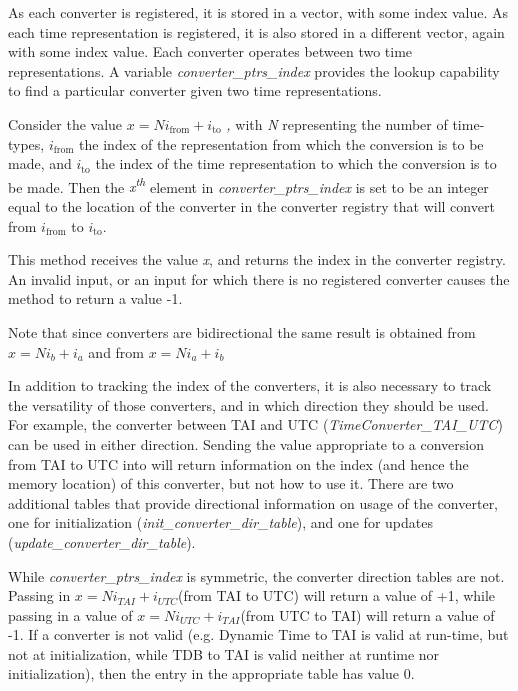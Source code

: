 {\begin{enumerate}
{\begin{enumerate}
\label{ref:getconvptrindex}As each converter is registered, it is stored
in a vector, with some index value.  As each time representation is
registered, it is also stored in a different vector, again with some
index value.  Each converter operates between two time representations.
 A variable \textit{converter\_ptrs\_index }provides the lookup
capability to find a particular converter given two time
representations.




Consider the value  $x=Ni_{\text{from}}+i_{\text{to}}$\textit{ , }with 
\textit{N}
representing the number of time-types,  $i_{\text{from}}$ the index of
the representation from which the conversion is to be made, and 
$i_{\text{to}}$ the index of the time representation to which the
conversion is to be made.  Then the
\textit{x}\textit{\textsuperscript{th}}\textit{ }element in 
\textit{converter\_ptrs\_index }is set to be  an integer equal to the
location of the converter in the converter registry that will convert
from $i_{\text{from}}$ to  $i_{\text{to}}$.




This method receives the value \textit{x}, and returns the index in the
converter registry.  An invalid input, or an input for which there is
no registered converter causes the method to return a value -1.  




Note that since converters are bidirectional the same result is
obtained from  $x=Ni_{b}+i_{a}$ and from   $x=Ni_{a}+i_{b}$

\label{ref:getconvdirinit}In addition to tracking the index of the
converters, it is also necessary to track the versatility of those
converters, and in which direction they should be used.  For example,
the converter between TAI and UTC (\textit{TimeConverter\_TAI\_UTC})
can be used in either direction.  Sending the value appropriate to a
conversion from TAI to UTC into 
 will return information on the index (and hence the memory location) 
 of this converter, but not how to use it.  There are two
additional tables that provide directional information on usage of the
converter, one for initialization
(\textit{init\_converter\_dir\_table}), and one for updates
(\textit{update\_converter\_dir\_table}).




While \textit{converter\_ptrs\_index }is symmetric,\textit{ }the
converter direction tables are not.  Passing in 
$x=Ni_{\mathit{TAI}}+i_{\mathit{UTC}}$(from TAI to UTC) will return a
value of +1, while passing in a value of  
$x=Ni_{\mathit{UTC}}+i_{\mathit{TAI}}$(from UTC to TAI) will return a
value of -1.  If a converter is not valid (e.g. Dynamic Time to TAI is
valid at run-time, but not at initialization, while TDB to TAI is valid
neither at runtime nor initialization), then the entry in the
appropriate table has value 0.





\end{enumerate}}
\end{enumerate}}
